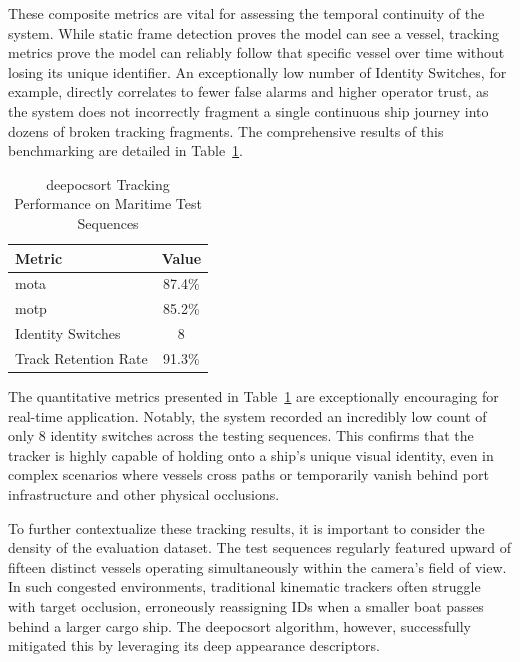 These composite metrics are vital for assessing the temporal continuity of the system. While static frame detection proves the model can see a vessel, tracking metrics prove the model can reliably follow that specific vessel over time without losing its unique identifier. An exceptionally low number of Identity Switches, for example, directly correlates to fewer false alarms and higher operator trust, as the system does not incorrectly fragment a single continuous ship journey into dozens of broken tracking fragments. The comprehensive results of this benchmarking are detailed in Table~\ref{c5:tab:tracking}.

\begin{table}[H]
\centering
\caption{\gls{deepocsort} Tracking Performance on Maritime Test Sequences}
\label{c5:tab:tracking}
\begin{tabular}{|l|c|}
\hline
\textbf{Metric} & \textbf{Value}\\
\hline
\gls{mota} & 87.4\%\\
\hline
\gls{motp} & 85.2\%\\
\hline
Identity Switches & 8\\
\hline
Track Retention Rate & 91.3\%\\
\hline
\end{tabular}
\end{table}

The quantitative metrics presented in Table~\ref{c5:tab:tracking} are exceptionally encouraging for real-time application. Notably, the system recorded an incredibly low count of only 8 identity switches across the testing sequences. This confirms that the tracker is highly capable of holding onto a ship's unique visual identity, even in complex scenarios where vessels cross paths or temporarily vanish behind port infrastructure and other physical occlusions.

To further contextualize these tracking results, it is important to consider the density of the evaluation dataset. The test sequences regularly featured upward of fifteen distinct vessels operating simultaneously within the camera's field of view. In such congested environments, traditional kinematic trackers often struggle with target occlusion, erroneously reassigning IDs when a smaller boat passes behind a larger cargo ship. The \gls{deepocsort} algorithm, however, successfully mitigated this by leveraging its deep appearance descriptors. 

